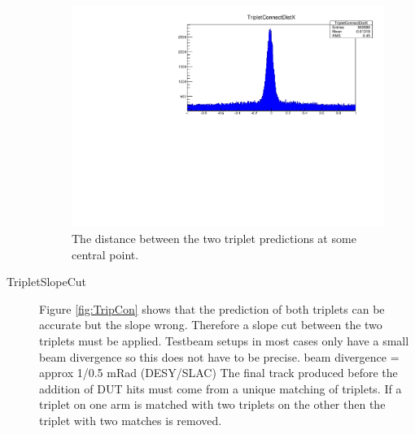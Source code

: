 \begin{description}
\begin{figure}[H]
\centering
\includegraphics[width=1.0\linewidth]{figures/TripletConnectDistX-442.pdf}
\caption{The distance between the two triplet predictions at some central point.}
\label{fig:TripCen}
\end{figure}

\item[TripletSlopeCut] Figure \ref{fig:TripCon} shows that the prediction of both triplets can be accurate but the slope wrong. Therefore a slope cut between the two triplets must be applied. Testbeam setups in most cases only have a small beam divergence so this does not have to be precise.
\newline
\newline 
beam divergence = approx 1/0.5 mRad (DESY/SLAC)
\newline
\newline
The final track produced before the addition of DUT hits must come from a unique matching of triplets. If a triplet on one arm is matched with two triplets on the other then the triplet with two matches is removed.


\end{description}
